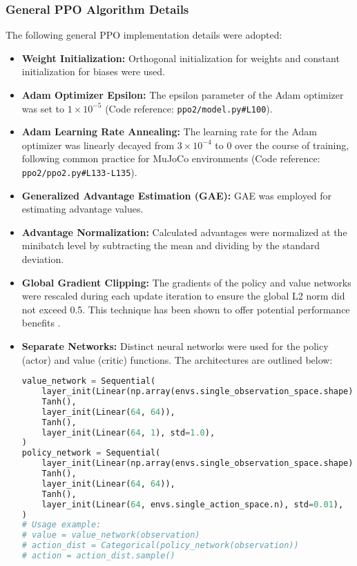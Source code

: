 \documentclass{article}
\begin{document}
\subsubsection{General PPO Algorithm Details}
The following general PPO implementation details were adopted:
\begin{itemize}
    \item \textbf{Weight Initialization:} Orthogonal initialization for weights and constant initialization for biases were used.
    \item \textbf{Adam Optimizer Epsilon:} The epsilon parameter of the Adam optimizer was set to \(1 \times 10^{-5}\) (Code reference: \texttt{ppo2/model.py\#L100}).
    \item \textbf{Adam Learning Rate Annealing:} The learning rate for the Adam optimizer was linearly decayed from \(3 \times 10^{-4}\) to 0 over the course of training, following common practice for MuJoCo environments (Code reference: \texttt{ppo2/ppo2.py\#L133-L135}).
    \item \textbf{Generalized Advantage Estimation (GAE):} GAE was employed for estimating advantage values.
    \item \textbf{Advantage Normalization:} Calculated advantages were normalized at the minibatch level by subtracting the mean and dividing by the standard deviation.
    \item \textbf{Global Gradient Clipping:} The gradients of the policy and value networks were rescaled during each update iteration to ensure the global L2 norm did not exceed 0.5. This technique has been shown to offer potential performance benefits \cite{andrychowicz2021what}.
    \item \textbf{Separate Networks:} Distinct neural networks were used for the policy (actor) and value (critic) functions. The architectures are outlined below:
    \begin{lstlisting}[language=Python]
value_network = Sequential(
    layer_init(Linear(np.array(envs.single_observation_space.shape).prod(), 64)),
    Tanh(),
    layer_init(Linear(64, 64)),
    Tanh(),
    layer_init(Linear(64, 1), std=1.0),
)
policy_network = Sequential(
    layer_init(Linear(np.array(envs.single_observation_space.shape).prod(), 64)),
    Tanh(),
    layer_init(Linear(64, 64)),
    Tanh(),
    layer_init(Linear(64, envs.single_action_space.n), std=0.01),
)
# Usage example:
# value = value_network(observation)
# action_dist = Categorical(policy_network(observation))
# action = action_dist.sample()
    \end{lstlisting}
\end{itemize}
\end{document}
